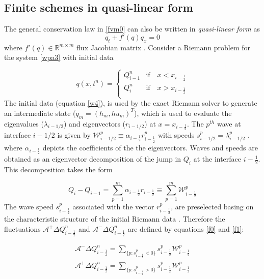\documentclass[11pt,a4paper]{article}
\newcommand{\donna}[1]{{\color{red}{#1}}}
\begin{document}
	\subsection{Finite schemes in quasi-linear form}
	\donna{Be careful with references here. }
	The general conservation law in \eqref{fvm0} can also be written in {\em quasi-linear form}
as
\begin{equation}
	q_{t} + f'(q)q_{x} = 0
	\label{wpa3}
\end{equation}
where  $f'(q) \in \mathbb{R}^{m\times m}$  flux Jacobian matrix \cite{be-ge-le-ma:2011}.  Consider a Riemann problem for the system  \eqref{wpa3} with initial data 

\begin{equation}
	q(x,t^n)  = \begin{cases}
		Q_{i-1}^{n}  & \text{if} \quad  x < x_{i-\frac{1}{2}}\\
		Q_{i}^{n} & \text{if} \quad x > x_{i-\frac{1}{2}}\\
	\end{cases}    
	\label{w4}   
\end{equation}
The initial data (equation \eqref{w4}), is used by the exact Riemann solver to generate an intermediate state ($q_m = (h_m, hu_m)^T$), which is used to evaluate the eigenvalues ($\lambda_{i-1/2}$) and eigenvectors ($r_{i-1/2}$) at $x = x_{i-\frac{1}{2}}$. The $p^{th}$ wave at interface $i-1/2$ is given by $\mathcal W^p_{i-1/2} \equiv \alpha_{i-\frac{1}{2}} r^p_{i-\frac{1}{2}}$ with speeds $s^p_{i-1/2} = \lambda^p_{i-1/2}$ \cite{leveque2002finite}. where $ \alpha_{i-\frac{1}{2}}$ depicts the coefficients of the the eigenvectors.  Waves and speeds are obtained as an eigenvector decomposition of the jump in $Q_i$ at the interface $i-\frac{1}{2}$.  This decomposition takes the form

\begin{equation}
	Q_{i} -  Q_{i-1} = \sum_{p=1}^{m}  \alpha_{i-\frac{1}{2}} r_{i-\frac{1}{2}} \equiv \sum_{p=1}^{m} \mathcal{W}_{i-\frac{1}{2}}^{p}
	\label{wpa19}
\end{equation}
The wave speed $s_{i-\frac{1}{2}}^{p}$ associated with the vector $r_{i-\frac{1}{2}}^{p}$, are preselected basing on the characteristic structure of the initial Riemann data  \cite{ge:2008}. Therefore the fluctuations $\mathcal{A^{+}}\Delta Q_{i-\frac{1}{2}}^{n}$  and $\mathcal{A^{-}}\Delta Q_{i-\frac{1}{2}}^{n} $ are defined by equations \eqref{f0} and \eqref{f1}:

\begin{eqnarray}
	\mathcal{A^{-}}\Delta Q_{i-\frac{1}{2}}^{n} = \sum_{\{ p:s_{i-\frac{1}{2}}^{p}<0\}} s_{i-\frac{1}{2}}^{p} \mathcal{W}_{i-\frac{1}{2}}^{p}
	\label{f0}\\
	\mathcal{A^{+}}\Delta Q_{i-\frac{1}{2}}^{n} =\sum_{\{ p:s_{i-\frac{1}{2}}^{p}>0\}} s_{i-\frac{1}{2}}^{p} \mathcal{W}_{i-\frac{1}{2}}^{p}
	\label{f1}
\end{eqnarray}
\end{document}
